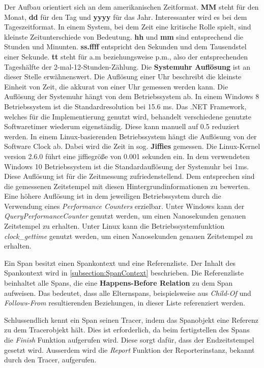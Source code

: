 Der Aufbau orientiert sich an dem amerikanischen Zeitformat. \textbf{MM} steht für den Monat, \textbf{dd} für den Tag und \textbf{yyyy} für das Jahr. Interessanter wird es bei dem Tageszeitformat. In einem System, bei dem Zeit eine kritische Rolle spielt, sind kleinste Zeitunterschiede von Bedeutung. \textbf{hh} und \textbf{mm} sind entsprechend die Stunden und Minunten. \textbf{ss.ffff} entspricht den Sekunden und dem Tausendstel einer Sekunde. \textbf{tt} steht für a.m beziehungsweise p.m., also der entsprechenden Tageshälfte der 2-mal-12-Stunden-Zählung. Die \textbf{Systemuhr Auflösung} ist an dieser Stelle erwähnenswert. Die Auflösung einer Uhr beschreibt die kleinste Einheit von Zeit, die akkurat von einer Uhr gemessen werden kann. Die Auflösung der Systemuhr hängt von dem Betriebssystem ab. In einem Windows 8  Betriebssystem ist die Standardresolution bei 15.6 ms. Das .NET Framework, welches für die Implementierung genutzt wird, behandelt verschiedene genutzte Softwaretimer wiederum eigenständig. Diese kann manuell auf 0.5 reduziert werden. In einem Linux-basierenden Betriebssystem hängt die Auflösung von der Software Clock ab. Dabei wird die Zeit in sog. \textbf{Jiffies} gemessen. Die Linux-Kernel version 2.6.0 führt eine jiffiegröße von 0.001 sekunden ein. In dem verwendeten Windows 10 Betriebssystem ist die Standardauflösung der Systemuhr bei 1ms. Diese Auflösung ist für die Zeitmessung zufriedenstellend. Dem entsprechen sind die gemessenen Zeitstempel mit diesen Hintergrundinformationen zu bewerten. Eine höhere Auflösung ist in dem jeweiligen Betriebssystem durch die Verwendung eines \emph{Performance Counters} erzielbar. Unter Windows kann der \emph{QueryPerformanceCounter} genutzt werden, um einen Nanosekunden genauen Zeitstempel zu erhalten. Unter Linux kann die Betriebssystemfunktion \emph{clock\_gettime} genutzt werden, um einen Nanosekunden genauen Zeitstempel zu erhalten.

Ein Span besitzt einen Spankontext und eine Referenzliste. Der Inhalt des Spankontext wird in \cref{subsection:SpanContext} beschrieben. Die Referenzliste beinhaltet alle Spans, die eine \textbf{Happens-Before Relation} zu dem Span aufweisen. Das bedeutet, dass alle Elternspans, beispielsweise aus \emph{Child-Of} und \emph{Follows-From} resultierenden Beziehungen, in dieser Liste referenziert werden.

Schlussendlich kennt ein Span seinen Tracer, indem das Spanobjekt eine Referenz zu dem Tracerobjekt hält. Dies ist erforderlich, da beim fertigstellen des Spans die \emph{Finish} Funktion aufgerufen wird. Diese sorgt dafür, dass der Endzeitstempel gesetzt wird. Ausserdem wird die \emph{Report} Funktion der Reporterinstanz, bekannt durch den Tracer, aufgerufen. 


